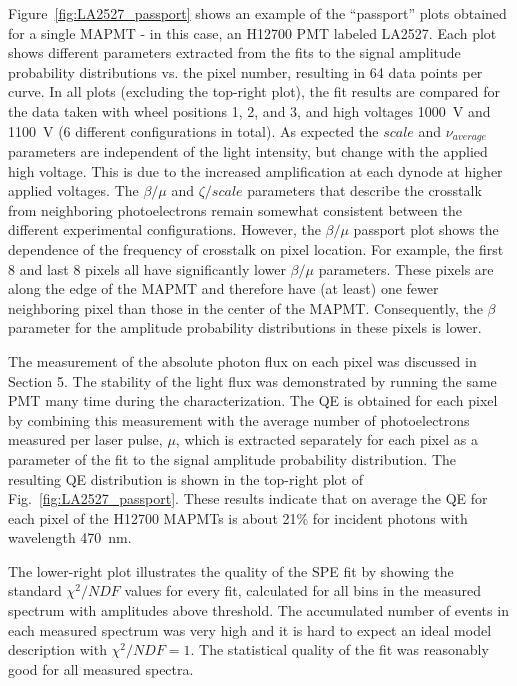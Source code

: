 Figure~\ref{fig:LA2527_passport} shows an example of the ``passport'' plots obtained for a single MAPMT - in this case, an H12700 PMT labeled LA2527. 
Each plot shows different parameters extracted from the fits to the signal amplitude probability distributions vs. the pixel number, resulting in 64 data points per curve.
In all plots (excluding the top-right plot), the fit results are compared for the data taken with wheel positions 1, 2, and 3, and high voltages 1000~V and 1100~V (6 different configurations in total).
As expected the $scale$ and $\nu_{average}$ parameters are independent of the light intensity, but change with the applied high voltage. 
This is due to the increased amplification at each dynode at higher applied voltages.
The $\beta/\mu$ and $\zeta/scale$ parameters that describe the crosstalk from neighboring photoelectrons remain somewhat consistent between the different experimental configurations. 
However, the $\beta/\mu$ passport plot shows the dependence of the frequency of crosstalk on pixel location. For example, the first 8 and last 8 pixels all have significantly lower $\beta/\mu$ parameters. These pixels are along the edge of the MAPMT and therefore have (at least) one fewer neighboring pixel than those in the center of the MAPMT.
Consequently, the $\beta$ parameter for the amplitude probability distributions in these pixels is lower. 

The measurement of the absolute photon flux on each pixel was discussed in Section 5. 
The stability of the light flux was demonstrated by running the same PMT many time during the characterization.
The QE is obtained for each pixel by combining this measurement with the average number of photoelectrons measured per laser pulse, $\mu$, which is extracted separately for each pixel as a parameter of the fit to the signal amplitude probability distribution. The resulting QE distribution is shown in the top-right plot of Fig.~\ref{fig:LA2527_passport}. These results indicate that on average the QE for each pixel of the H12700 MAPMTs is about 21$\%$ for incident photons with wavelength 470~nm.

The lower-right plot illustrates the quality of the SPE fit by showing the standard $\chi^2/NDF$ values for every fit, calculated for all bins in the measured spectrum with amplitudes above threshold. The accumulated number of events in each measured spectrum was very high and it is hard to expect an ideal model description with $\chi^2/NDF = 1$. The statistical quality of the fit was reasonably good for all measured spectra.

